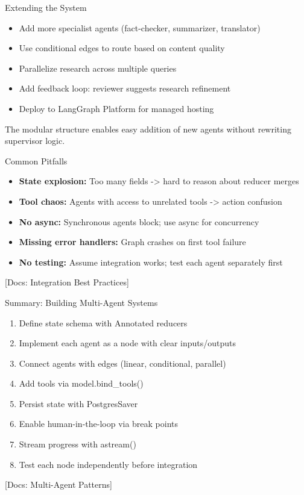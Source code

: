 \documentclass[aspectratio=169,11pt]{beamer}
\newcommand{\docref}[1]{{\scriptsize\color{docgray}[Docs: #1]}}
\begin{document}
\begin{frame}{Extending the System}
\setlength{\itemsep}{1pt}
\begin{itemize}
\item Add more specialist agents (fact-checker, summarizer, translator)
\item Use conditional edges to route based on content quality
\item Parallelize research across multiple queries
\item Add feedback loop: reviewer suggests research refinement
\item Deploy to LangGraph Platform for managed hosting
\end{itemize}
\vspace{0.15cm}
\begin{conceptbox}[Flexibility]
The modular structure enables easy addition of new agents without rewriting supervisor logic.
\end{conceptbox}
\end{frame}

\begin{frame}{Common Pitfalls}
\setlength{\itemsep}{1pt}
\begin{itemize}
\item \textbf{State explosion:} Too many fields -> hard to reason about reducer merges
\item \textbf{Tool chaos:} Agents with access to unrelated tools -> action confusion
\item \textbf{No async:} Synchronous agents block; use async for concurrency
\item \textbf{Missing error handlers:} Graph crashes on first tool failure
\item \textbf{No testing:} Assume integration works; test each agent separately first
\end{itemize}
\vspace{0.1cm}
\docref{Integration Best Practices}
\end{frame}

\begin{frame}{Summary: Building Multi-Agent Systems}
\setlength{\itemsep}{1pt}
\begin{enumerate}
\item Define state schema with Annotated reducers
\item Implement each agent as a node with clear inputs/outputs
\item Connect agents with edges (linear, conditional, parallel)
\item Add tools via model.bind\_tools()
\item Persist state with PostgresSaver
\item Enable human-in-the-loop via break points
\item Stream progress with astream()
\item Test each node independently before integration
\end{enumerate}
\vspace{0.15cm}
\docref{Multi-Agent Patterns}
\end{frame}
\end{document}
